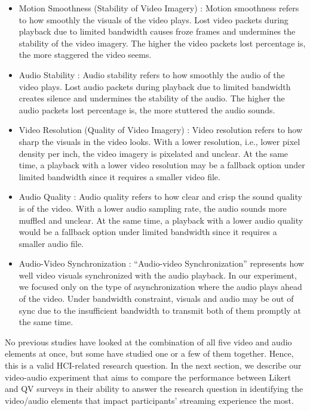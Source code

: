 \begin{itemize}
    \item Motion Smoothness (Stability of Video Imagery) \cite{claypool1999effects}: Motion smoothness refers to how smoothly the visuals of the video plays. Lost video packets during playback due to limited bandwidth causes froze frames and undermines the stability of the video imagery. The higher the  video packets lost percentage is, the more staggered the video seems.
    \item Audio Stability \cite{claypool1999effects}: Audio stability refers to how smoothly the audio of the video plays. Lost audio packets during playback due to limited bandwidth creates silence and undermines the stability of the audio. The higher the audio packets lost percentage is, the more stuttered the audio sounds.
    \item Video Resolution (Quality of Video Imagery) \cite{oeldorf2012bad, knoche2008low}: Video resolution refers to how sharp the visuals in the video looks. With a lower resolution, i.e., lower pixel density per inch, the video imagery is pixelated and unclear. At the same time, a playback with a lower video resolution may be a fallback option under limited bandwidth since it requires a smaller video file.
    \item Audio Quality \cite{oeldorf2012bad, noll1993wideband}: Audio quality refers to how clear and crisp the sound quality is of the video. With a lower audio sampling rate, the audio sounds more muffled and unclear. At the same time, a playback with a lower audio quality would be a fallback option under limited bandwidth since it requires a smaller audio file.
    \item Audio-Video Synchronization \cite{steinmetz1996human}: ``Audio-video Synchronization'' represents how well video visuals synchronized with the audio playback. In our experiment, we focused only on the type of asynchronization where the audio plays ahead of the video. Under bandwidth constraint, visuals and audio may be out of sync due to the insufficient bandwidth to transmit both of them promptly at the same time.
\end{itemize}

No previous studies have looked at the combination of all five video and audio elements at once, but some have studied one or a few of them together. Hence, this is a valid HCI-related research question. 
In the next section, we describe our video-audio experiment that aims to compare the performance between Likert and QV surveys in their ability to answer the research question in identifying the video/audio elements that impact participants' streaming experience the most.

